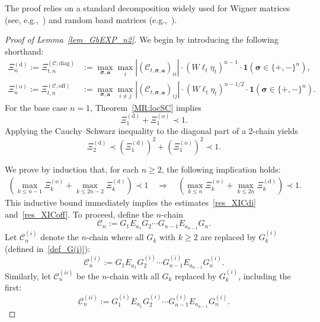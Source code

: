 \documentclass[10pt,reqno]{article}
\theoremstyle{plain} %
\theoremstyle{remark}
\numberwithin{equation}{section}
\begin{document}
The proof relies on a standard decomposition widely used for Wigner matrices (see, e.g.,~\cite{erdHos2012rigidity}) and random band matrices (e.g.,~\cite{Average_fluc}).

\begin{proof}[Proof of Lemma~\ref{lem_GbEXP_n2}]
We begin by introducing the following shorthand:
\begin{align}
\Xi_n^{(\mathrm{d})} := \Xi_{t,n}^{(\mathcal{C}, \mathrm{diag})} 
&:= \max_{\boldsymbol{\sigma}, \mathbf{a}} \max_i \left| \left( \mathcal{C}_{t, \boldsymbol{\sigma}, \mathbf{a}} \right)_{ii} \right| 
\cdot (W \ell_t \eta_t)^{n-1} \cdot \mathbf{1}\left( \boldsymbol{\sigma} \in \{+, -\}^n \right), \\
\Xi_n^{(\mathrm{o})} := \Xi_{t,n}^{(\mathcal{C}, \mathrm{off})} 
&:= \max_{\boldsymbol{\sigma}, \mathbf{a}} \max_{i \ne j} \left| \left( \mathcal{C}_{t, \boldsymbol{\sigma}, \mathbf{a}} \right)_{ij} \right| 
\cdot (W \ell_t \eta_t)^{n - 1/2} \cdot \mathbf{1}\left( \boldsymbol{\sigma} \in \{+, -\}^n \right).
\end{align}
For the base case \( n = 1 \), Theorem~\ref{MR:locSC} implies
\[
\Xi_1^{(\mathrm{d})} + \Xi_1^{(\mathrm{o})} \prec 1.
\]
Applying the Cauchy–Schwarz inequality to the diagonal part of a 2-chain yields
\[
\Xi_2^{(\mathrm{d})} \prec \left( \Xi_1^{(\mathrm{d})} \right)^2 + \left( \Xi_1^{(\mathrm{o})} \right)^2 \prec 1.
\]

We prove by induction that, for each \(n\ge 2\), the following implication holds:
\begin{align}\label{aspchain}
\left( \max_{k \le n - 1} \Xi_k^{(\mathrm{o})} + \max_{k \le 2n - 2} \Xi_k^{(\mathrm{d})} \right) \prec 1 
\quad \Longrightarrow \quad 
\left( \max_{k \le n} \Xi_k^{(\mathrm{o})} + \max_{k \le 2n} \Xi_k^{(\mathrm{d})} \right) \prec 1.
\end{align}
This inductive bound immediately implies the estimates~\eqref{res_XICdi} and~\eqref{res_XICoff}.
To proceed, define the $n$-chain
\begin{equation}\label{defSPChain}
\mathcal{C}_n := G_1 E_{a_1} G_2 \cdots G_{n-1} E_{a_{n-1}} G_n.
\end{equation}
Let \( \mathcal{C}_n^{(i)} \) denote the $n$-chain where all \( G_k \) with \( k \ge 2 \) are replaced by \( G_k^{(i)} \) (defined in~\eqref{def_G(i)}):
\begin{equation}\label{defCn_i}
\mathcal{C}_n^{(i)} := G_1 E_{a_1} G^{(i)}_2 \cdots G^{(i)}_{n-1} E_{a_{n-1}} G^{(i)}_n.
\end{equation}
Similarly, let \( \mathcal{C}_n^{(ii)} \) be the $n$-chain with all \( G_k \) replaced by \( G_k^{(i)} \), including the first:
\begin{equation}\label{defCn_ii}
\mathcal{C}_n^{(ii)} := G^{(i)}_1 E_{a_1} G^{(i)}_2 \cdots G^{(i)}_{n-1} E_{a_{n-1}} G^{(i)}_n.
\end{equation}


\end{proof}
\end{document}
